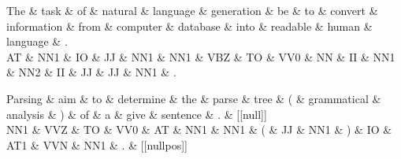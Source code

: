 \documentclass{article}
\begin{document}
\begin{dependency}[theme = simple]
\begin{deptext}[column sep=1em]
The \& task \& of \& natural \& language \& generation \& be \& to \& convert \& information \& from \& computer \& database \& into \& readable \& human \& language \& . \\
AT \& NN1 \& IO \& JJ \& NN1 \& NN1 \& VBZ \& TO \& VV0 \& NN \& II \& NN1 \& NN2 \& II \& JJ \& JJ \& NN1 \& . \\
\end{deptext}
\end{dependency}

\begin{dependency}[theme = simple]
\begin{deptext}[column sep=1em]
Parsing \& aim \& to \& determine \& the \& parse \& tree \& ( \& grammatical \& analysis \& ) \& of \& a \& give \& sentence \& . \& {[}{[}null{]}{]} \\
NN1 \& VVZ \& TO \& VV0 \& AT \& NN1 \& NN1 \& ( \& JJ \& NN1 \& ) \& IO \& AT1 \& VVN \& NN1 \& . \& {[}{[}nullpos{]}{]} \\
\end{deptext}
\end{dependency}
\end{document}
